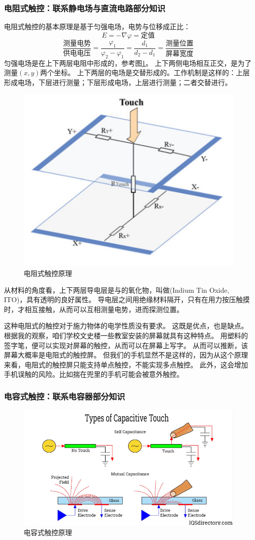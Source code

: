 \documentclass[UTF-8]{ctexart}
\begin{document}
\subsubsection{电阻式触控：联系静电场与直流电路部分知识}


电阻式触控的基本原理是基于匀强电场，电势与位移成正比：
$$
E = -\nabla \varphi=\text{定值}   
$$
$$
\frac{\text{测量电势}}{\text{供电电压}}=\frac{\varphi_1}{\varphi_2-\varphi_1}=\frac{d_1}{d_2-d_1}=\frac{\text{测量位置}}{\text{屏幕宽度}}
$$
匀强电场是在上下两层电阻中形成的\cite{Touch}，参考图\ref{电阻式触控原理}。
上下两侧电场相互正交，是为了测量$(x,y)$两个坐标。
上下两层的电场是交替形成的。工作机制是这样的：上层形成电场，下层进行测量；下层形成电场，上层进行测量；二者交替进行。
\begin{figure}
    \centering
    \includegraphics[width=0.5\linewidth]{../Figures/resistive.png}
    \caption{电阻式触控原理\cite{Touch}}
    \label{电阻式触控原理}
\end{figure}
从材料的角度看，上下两层导电层是与的氧化物，叫做(Indium Tin Oxide, ITO)，具有透明的良好属性\cite{ITO}。
导电层之间用绝缘材料隔开，只有在用力按压触摸时，才相互接触，从而可以互相测量电势，进而探测位置。

这种电阻式的触控对于施力物体的电学性质没有要求。
这既是优点，也是缺点。
根据我的观察，咱们学校文史楼一些教室安装的屏幕就具有这种特点。
用塑料的签字笔，便可以实现对屏幕的触控，从而可以在屏幕上写字。
从而可以推断，该屏幕大概率是电阻式的触控屏。
但我们的手机显然不是这样的，因为从这个原理来看，电阻式的触控屏只能支持单点触控，不能实现多点触控。
此外，这会增加手机误触的风险。比如揣在兜里的手机可能会被意外触控。

\subsubsection{电容式触控：联系电容器部分知识}

\begin{figure}
    \centering
    \includegraphics[width=0.7\linewidth]{../Figures/capacitive.png}
    \caption{电容式触控原理\cite{Capacitive}}
    \label{电容式触控原理}
\end{figure}
\end{document}
